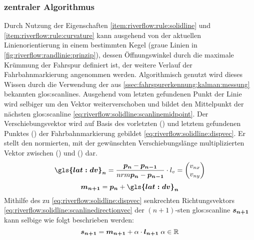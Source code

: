 \subsubsection{zentraler Algorithmus}
Durch Nutzung der Eigenschaften \ref{item:riverflow:rule:solidline} und  \ref{item:riverflow:rule:curvature} kann ausgehend von der aktuellen Linienorientierung in einem bestimmten Kegel (graue Linien in \ref{fig:riverflow:randlinie:prinzip}), dessen Öffnungswinkel durch die maximale Krümmung der Fahrspur definiert ist, der weitere Verlauf der Fahrbahnmarkierung angenommen werden.
Algorithmisch genutzt wird dieses Wissen durch die Verwendung der aus \ref{ssec:fahrspurerkennung:kalman:messung} bekannten \glspl{glos:scanline}.
Ausgehend vom letzten gefundenen Punkt der Linie  wird selbiger um den Vektor  weiterverschoben und bildet den Mittelpunkt   der nächsten \gls{glos:scanline} \eqref{eq:riverflow:solidline:scanlinemidpoint}. Der Verschiebungsvektor  wird auf Basis des vorletzten () und letztem gefundenen Punktes  () der Fahrbahnmarkierung gebildet \eqref{eq:riverflow:solidline:dispvec}. Er stellt den normierten, mit der gewünschten Verschiebungslänge  multiplizierten Vektor zwischen () und () dar.
\begin{equation}
\label{eq:riverflow:solidline:dispvec}
\vct{\gls{lat:dv}_n} =  \frac{\pnt{p_{n}} - \pnt{p_{n-1}}}{nrm{\pnt{p_{n}} - \pnt{p_{n-1}}}} \cdot \scl{l_v}
= 
\begin{pmatrix}
\scl{v_{nx}} \\
\scl{v_{ny}}
\end{pmatrix}
\end{equation}
\begin{equation}
\label{eq:riverflow:solidline:scanlinemidpoint}
\pnt{m_{n+1}} =  \pnt{p_n} + \vct{\gls{lat:dv}_n}
\end{equation}
Mithilfe des zu  \eqref{eq:riverflow:solidline:dispvec} senkrechten Richtungsvektors  \eqref{eq:riverflow:solidline:scanlinedirectionvec} der \begin{math} (n+1)\end{math}-sten  \gls{glos:scanline} \begin{math} \boldsymbol{s_{n+1}} \end{math} kann selbige wie folgt beschrieben werden:
\begin{equation}
\label{eq:riverflow:solidline:scanlinecontinous}
\boldsymbol{s_{n+1}} =
\boldsymbol{m_{n+1}}  + \alpha \cdot \boldsymbol{l_{n+1}}
\; \alpha \in \mathbb{R}
\end{equation}
